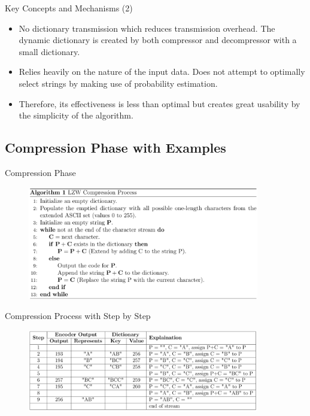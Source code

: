 \documentclass[10pt,handout,english]{beamer}
\begin{document}
\begin{frame}{Key Concepts and Mechanisms (2)}
    \begin{itemize}[label=\textcolor{purple}{$\bullet$}]
        \item No dictionary transmission which reduces transmission overhead. The dynamic dictionary is created by both compressor and decompressor with a small dictionary.
        \item Relies heavily on the nature of the input data. Does not attempt to optimally select strings by making use of probability estimation.
        \item Therefore, its effectiveness is less than optimal but creates great usability by the simplicity of the algorithm.
    \end{itemize}
\end{frame}

\subsection{Compression Phase with Examples}
\begin{frame}{Compression Phase}
    \begin{figure}
        \centering
        \includegraphics[width=0.9\textwidth]{pic/pseudo_compress.png}
    \end{figure}
    
\end{frame}

\begin{frame}{Compression Process with Step by Step}
    \begin{figure}
        \centering
        \includegraphics[width=0.9\textwidth]{pic/example_compress.png}
    \end{figure}
\end{frame}
\end{document}
